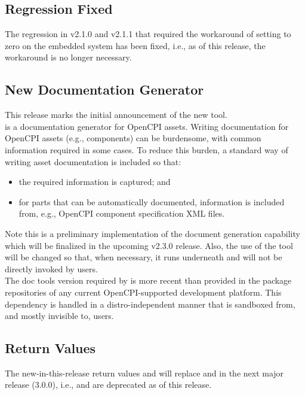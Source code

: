 \subsection{ Regression Fixed}
\label{sec:22_zcu104}
The  regression in v2.1.0 and v2.1.1 that required the workaround of setting  to zero on the embedded system has been fixed, i.e., as of this release, the workaround is no longer necessary.

\subsection{New Documentation Generator}
\label{sec:22_ocpidoc}
This release marks the initial announcement of the new  tool.\\

 is a documentation generator for OpenCPI assets.  Writing documentation for OpenCPI assets (e.g., components) can be burdensome, with common information required in some cases. To reduce this burden, a standard way of writing asset documentation is included so that:
\begin{itemize}
\setlength\itemsep{0em} %
\item the required information is captured; and
\item for parts that can be automatically documented, information is included from, e.g., OpenCPI component specification XML files.
\end{itemize}

Note this is a preliminary implementation of the document generation capability which will be finalized in the upcoming v2.3.0 release.  Also, the use of the  tool will be changed so that, when necessary, it runs underneath  and will not be directly invoked by users.\\

The  doc tools version required by  is more recent than provided in the package repositories of any current OpenCPI-supported development platform.  This dependency is handled in a distro-independent manner that is sandboxed from, and mostly invisible to, users.

\subsection{ Return Values}
\label{sec:22_rcc_values}
The new-in-this-release  return values  and  will replace  and  in the next major release (3.0.0), i.e.,  and  are deprecated as of this release.

